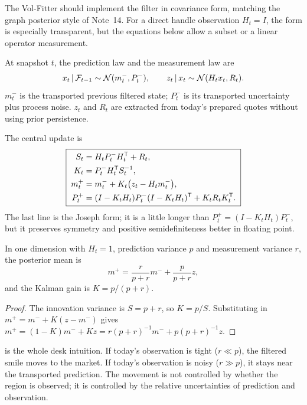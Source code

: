 \documentclass[11pt]{article}
\begin{document}
The Vol-Fitter should implement the filter in covariance form, matching the
graph posterior style of Note~14. For a direct handle observation $H_t=I$, the
form is especially transparent, but the equations below allow a subset or a
linear operator measurement.

\begin{definition}
\label{def:laws}
At snapshot $t$, the prediction law and the measurement law are
\[
x_t\,|\,\mathcal F_{t-1}\sim\mathcal N(m_t^-,P_t^-),
\qquad
z_t\,|\, x_t\sim\mathcal N(H_t x_t,R_t).
\]
$m_t^-$ is the transported previous filtered state; $P_t^-$ is its transported
uncertainty plus process noise. $z_t$ and $R_t$ are extracted from today's
prepared quotes without using prior persistence.
\end{definition}

The central update is
\begin{equation}
\boxed{\;
\begin{aligned}
S_t&=H_tP_t^-H_t^{\mathsf{T}}+R_t,\\
K_t&=P_t^-H_t^{\mathsf{T}} S_t^{-1},\\
m_t^+&=m_t^-+K_t\big(z_t-H_tm_t^-\big),\\
P_t^+&=(I-K_tH_t)P_t^-(I-K_tH_t)^{\mathsf{T}}+K_tR_tK_t^{\mathsf{T}} .
\end{aligned}
\;}
\label{eq:kalman}
\end{equation}
The last line is the Joseph form; it is a little longer than
$P_t^+=(I-K_tH_t)P_t^-$, but it preserves symmetry and positive
semidefiniteness better in floating point.

\begin{proposition}
\label{prop:scalar}
In one dimension with $H_t=1$, prediction variance $p$ and measurement variance
$r$, the posterior mean is
\[
m^+=\frac{r}{p+r}m^-+\frac{p}{p+r}z,
\]
and the Kalman gain is $K=p/(p+r)$.
\end{proposition}

\begin{proof}
The innovation variance is $S=p+r$, so $K=p/S$. Substituting in
$m^+=m^-+K(z-m^-)$ gives
$m^+=(1-K)m^-+Kz=r(p+r)^{-1}m^-+p(p+r)^{-1}z$.
\end{proof}

 is the whole desk intuition. If today's observation is tight
($r\ll p$), the filtered smile moves to the market. If today's observation is
noisy ($r\gg p$), it stays near the transported prediction. The movement is not
controlled by whether the region is observed; it is controlled by the relative
uncertainties of prediction and observation.
\end{document}
